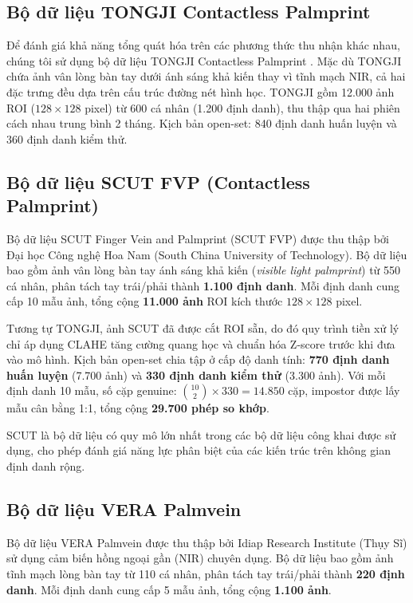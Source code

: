 \documentclass[12pt,a4paper]{article}
\begin{document}
\subsection{Bộ dữ liệu TONGJI Contactless Palmprint}

Để đánh giá khả năng tổng quát hóa trên các phương thức thu nhận khác nhau, chúng tôi sử dụng bộ dữ liệu TONGJI Contactless Palmprint \cite{b21}. Mặc dù TONGJI chứa ảnh vân lòng bàn tay dưới ánh sáng khả kiến thay vì tĩnh mạch NIR, cả hai đặc trưng đều dựa trên cấu trúc đường nét hình học. TONGJI gồm 12.000 ảnh ROI ($128 \times 128$ pixel) từ 600 cá nhân (1.200 định danh), thu thập qua hai phiên cách nhau trung bình 2 tháng. Kịch bản open-set: 840 định danh huấn luyện và 360 định danh kiểm thử.

\subsection{Bộ dữ liệu SCUT FVP (Contactless Palmprint)}

Bộ dữ liệu SCUT Finger Vein and Palmprint (SCUT FVP) \cite{b_scut} được thu thập bởi Đại học Công nghệ Hoa Nam (South China University of Technology). Bộ dữ liệu bao gồm ảnh vân lòng bàn tay ánh sáng khả kiến (\textit{visible light palmprint}) từ 550 cá nhân, phân tách tay trái/phải thành \textbf{1.100 định danh}. Mỗi định danh cung cấp 10 mẫu ảnh, tổng cộng \textbf{11.000 ảnh} ROI kích thước $128 \times 128$ pixel.

Tương tự TONGJI, ảnh SCUT đã được cắt ROI sẵn, do đó quy trình tiền xử lý chỉ áp dụng CLAHE tăng cường quang học và chuẩn hóa Z-score trước khi đưa vào mô hình. Kịch bản open-set chia tập ở cấp độ danh tính: \textbf{770 định danh huấn luyện} (7.700 ảnh) và \textbf{330 định danh kiểm thử} (3.300 ảnh). Với mỗi định danh 10 mẫu, số cặp genuine: $\binom{10}{2} \times 330 = 14.850$ cặp, impostor được lấy mẫu cân bằng 1:1, tổng cộng \textbf{29.700 phép so khớp}.

SCUT là bộ dữ liệu có quy mô lớn nhất trong các bộ dữ liệu công khai được sử dụng, cho phép đánh giá năng lực phân biệt của các kiến trúc trên không gian định danh rộng.

\subsection{Bộ dữ liệu VERA Palmvein}

Bộ dữ liệu VERA Palmvein \cite{b_vera} được thu thập bởi Idiap Research Institute (Thụy Sĩ) sử dụng cảm biến hồng ngoại gần (NIR) chuyên dụng. Bộ dữ liệu bao gồm ảnh tĩnh mạch lòng bàn tay từ 110 cá nhân, phân tách tay trái/phải thành \textbf{220 định danh}. Mỗi định danh cung cấp 5 mẫu ảnh, tổng cộng \textbf{1.100 ảnh}.
\end{document}
